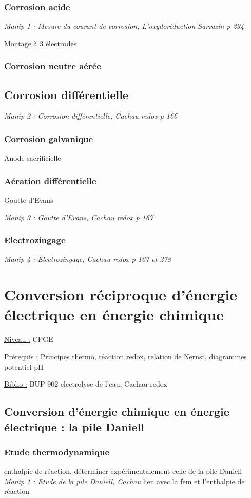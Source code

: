 \documentclass{article}%
\begin{document}
\subsubsection{Corrosion acide}
\textit{Manip 1 : Mesure du courant de corrosion, L'oxydoréduction Sarrazin p 294}

Montage à 3 électrodes
\subsubsection{Corrosion neutre aérée}
\subsection{Corrosion différentielle}
\textit{Manip 2 : Corrosion différentielle, Cachau redox p 166}
\subsubsection{Corrosion galvanique}
Anode sacrificielle
\subsubsection{Aération différentielle}
Goutte d'Evans

\textit{Manip 3 : Goutte d'Evans, Cachau redox p 167}
\subsubsection{Electrozingage}

\textit{Manip 4 : Electrozingage, Cachau redox p 167 et 278}

\section{Conversion réciproque d'énergie électrique en énergie chimique}
\underline{Niveau :} CPGE 

\underline{Prérequis :} Principes thermo, réaction redox, relation de Nernst, diagrammes potentiel-pH

\underline{Biblio :} BUP 902 electrolyse de l'eau, Cachau redox

\subsection{Conversion d'énergie chimique en énergie électrique : la pile Daniell}
\subsubsection{Etude thermodynamique}
enthalpie de réaction, déterminer expérimentalement celle de la pile Daniell
\textit{Manip 1 : Etude de la pile Daniell, Cachau}
lien avec la fem et l'enthalpie de réaction
\end{document}
